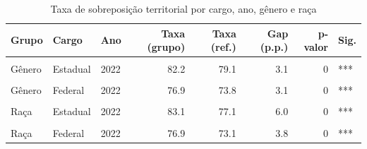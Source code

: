 \begin{table}[!h]
\centering
\caption{Taxa de sobreposição territorial por cargo, ano, gênero e raça}
\centering
\begin{tabular}[t]{lllrrrrl}
\toprule
Grupo & Cargo & Ano & Taxa (grupo) & Taxa (ref.) & Gap (p.p.) & p-valor & Sig.\\
\midrule
\cellcolor{gray!10}{Gênero} & \cellcolor{gray!10}{Estadual} & \cellcolor{gray!10}{2018} & \cellcolor{gray!10}{81.2} & \cellcolor{gray!10}{73.7} & \cellcolor{gray!10}{7.5} & \cellcolor{gray!10}{0} & \cellcolor{gray!10}{***}\\
Gênero & Estadual & 2022 & 82.2 & 79.1 & 3.1 & 0 & ***\\
\cellcolor{gray!10}{Gênero} & \cellcolor{gray!10}{Federal} & \cellcolor{gray!10}{2018} & \cellcolor{gray!10}{75.6} & \cellcolor{gray!10}{64.9} & \cellcolor{gray!10}{10.7} & \cellcolor{gray!10}{0} & \cellcolor{gray!10}{***}\\
Gênero & Federal & 2022 & 76.9 & 73.8 & 3.1 & 0 & ***\\
\cellcolor{gray!10}{Raça} & \cellcolor{gray!10}{Estadual} & \cellcolor{gray!10}{2018} & \cellcolor{gray!10}{80.2} & \cellcolor{gray!10}{72.6} & \cellcolor{gray!10}{7.6} & \cellcolor{gray!10}{0} & \cellcolor{gray!10}{***}\\
\addlinespace
Raça & Estadual & 2022 & 83.1 & 77.1 & 6.0 & 0 & ***\\
\cellcolor{gray!10}{Raça} & \cellcolor{gray!10}{Federal} & \cellcolor{gray!10}{2018} & \cellcolor{gray!10}{71.8} & \cellcolor{gray!10}{66.0} & \cellcolor{gray!10}{5.8} & \cellcolor{gray!10}{0} & \cellcolor{gray!10}{***}\\
Raça & Federal & 2022 & 76.9 & 73.1 & 3.8 & 0 & ***\\
\bottomrule
\end{tabular}
\end{table}
